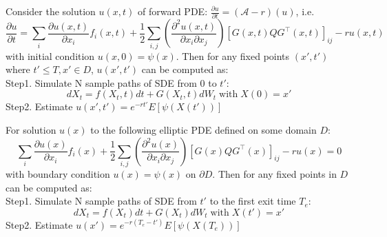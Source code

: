 \begin{algorithm}
    Consider the solution $u(x, t)$ of forward PDE: $\frac{\partial u}{\partial t}=(\mathcal{A}-r)(u)$, i.e.
    \begin{equation}
        \frac{\partial u}{\partial t}=\sum_{i} \frac{\partial u(x, t)}{\partial x_{i}} f_{i}(x, t)+\frac{1}{2} \sum_{i, j}\left(\frac{\partial^{2}u(x, t)}{\partial x_{i} \partial x_{j}}\right)\left[G(x, t) Q G^{\top}(x, t)\right]_{i j} - ru(x, t)
    \end{equation}
    with initial condition $u(x, 0)=\psi(x)$. Then for any fixed points $(x', t')$ where $t'\leq T, x'\in D$, $u(x', t')$ can be computed as:\\
    Step1. Simulate N sample paths of SDE from $0$ to $t'$:
    \begin{equation}
        dX_t=f(X_t, t)dt + G(X_t, t)dW_t\operatorname{with}X(0)=x'
    \end{equation}
    Step2. Estimate $u(x', t') = e^{-rt'}E\left[\psi(X(t'))\right]$
\end{algorithm}
\begin{algorithm}
    For solution $u(x)$ to the following elliptic PDE defined on some domain $D$:
    \begin{equation}
        \sum_{i} \frac{\partial u(x)}{\partial x_{i}} f_{i}(x)+\frac{1}{2} \sum_{i, j}\left(\frac{\partial^{2}u(x)}{\partial x_{i} \partial x_{j}}\right)\left[G(x) Q G^{\top}(x)\right]_{i j} - ru(x)=0
    \end{equation}
    with boundary condition $u(x)=\psi(x)$ on $\partial D$. Then for any fixed points in $D$ can be computed as:\\
    Step1. Simulate N sample paths of SDE from $t'$ to the first exit time $T_e$:
    \begin{equation}
        dX_t=f(X_t)dt + G(X_t)dW_t\operatorname{with}X(t')=x'
    \end{equation}
    Step2. Estimate $u(x') = e^{-r(T_e-t')}E\left[\psi(X(T_e))\right]$
\end{algorithm}




